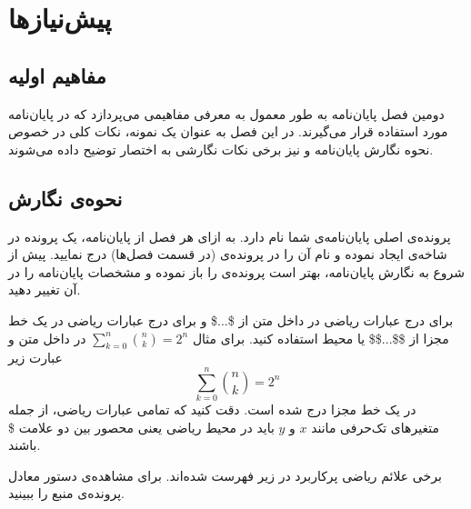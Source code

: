 \chapter{پیش‌نیازها}
\label{chapter:preliminaries}
\section{مفاهیم اولیه}

دومین فصل پایان‌نامه به طور معمول به معرفی مفاهیمی می‌پردازد که در پایان‌نامه مورد استفاده قرار می‌گیرند.
در این فصل به عنوان یک نمونه، نکات کلی در خصوص نحوه نگارش پایان‌نامه و نیز برخی نکات نگارشی به اختصار توضیح داده می‌شوند.

\section{نحوه‌ی نگارش}


پرونده‌ی اصلی پایان‌نامه‌ی شما   نام دارد.
به ازای هر فصل از پایان‌نامه، یک پرونده در شاخه‌ی  ایجاد نموده
و نام آن را در پرونده‌ی   (در قسمت فصل‌ها) درج نمایید.
پیش از شروع به نگارش پایان‌نامه، بهتر است پرونده‌ی  را باز نموده
و مشخصات پایان‌نامه را در آن تغییر دهید.



برای درج عبارات ریاضی در داخل متن از \$...\$ و
برای درج عبارات ریاضی در یک خط مجزا از \$\$...\$\$ یا محیط  استفاده کنید. برای مثال $\sum_{k=0}^{n} {n \choose k} = 2^n$ در داخل متن و عبارت زیر
\begin{equation}
\sum_{k=0}^{n} {n \choose k} = 2^n
\end{equation}
در یک خط مجزا درج شده است.
دقت کنید که تمامی عبارات ریاضی، از جمله متغیرهای تک‌حرفی مانند $x$ و $y$ باید در محیط ریاضی
یعنی محصور بین دو علامت \$ باشند.



برخی علائم ریاضی پرکاربرد در زیر فهرست شده‌اند.
برای مشاهده‌ی دستور  معادل پرونده‌ی منبع را ببینید.

